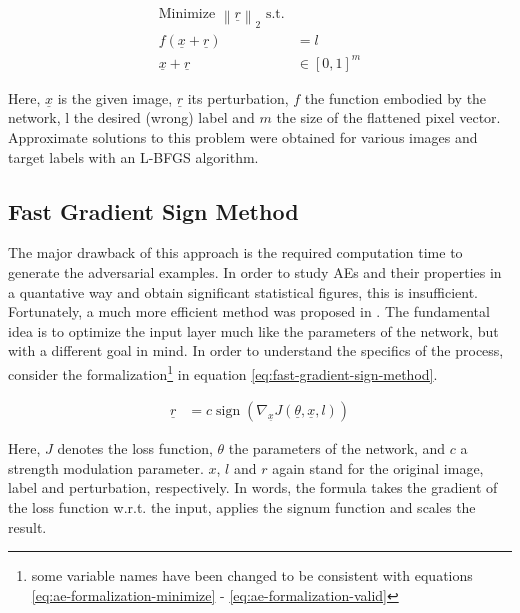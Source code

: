 \documentclass[11pt, a4paper]{article}
\newcommand\braces[1]{\left(#1\right)}
\newcommand\brackets[1]{\left[#1\right]}
\renewcommand{\vec}[1]{\underline{#1}}
\newcommand{\norm}[1]{\left\lVert#1\right\rVert}
\DeclareMathOperator{\sign}{sign}
\begin{document}
\begin{align}
	\text{Minimize $\norm{\vec{r}}_2$ s.t.} \label{eq:ae-formalization-minimize} \\
	f(\vec{x} + \vec{r}) &= l \label{eq:ae-formalization-label} \\
	\vec{x} + \vec{r} &\in \brackets{0, 1}^m \label{eq:ae-formalization-valid}
\end{align}

Here, $\vec{x}$ is the given image, $\vec{r}$ its perturbation, $f$ the function embodied by the network, l the desired (wrong) label and $m$ the size of the flattened pixel vector. Approximate solutions to this problem were obtained for various images and target labels with an L-BFGS algorithm.

\subsection{Fast Gradient Sign Method}
\label{sec:fast-gradient-sign-method}
The major drawback of this approach is the required computation time to generate the adversarial examples. In order to study AEs and their properties in a quantative way and obtain significant statistical figures, this is insufficient. Fortunately, a much more efficient method was proposed in \cite{explaining-and-harnessing-adversarial-examples}. The fundamental idea is to optimize the input layer much like the parameters of the network, but with a different goal in mind. In order to understand the specifics of the process, consider the formalization\footnote{some variable names have been changed to be consistent with equations \eqref{eq:ae-formalization-minimize} - \eqref{eq:ae-formalization-valid}} in equation \eqref{eq:fast-gradient-sign-method}.

\begin{align}
	\vec{r} &= c \sign \braces{\nabla_{\vec{x}} J\braces{\vec{\theta}, \vec{x}, l}} \label{eq:fast-gradient-sign-method}
\end{align}

Here, $J$ denotes the loss function, $\theta$ the parameters of the network, and $c$ a strength modulation parameter. $x$, $l$ and $r$ again stand for the original image, label and perturbation, respectively. In words, the formula takes the gradient of the loss function w.r.t. the input, applies the signum function and scales the result.
\end{document}
